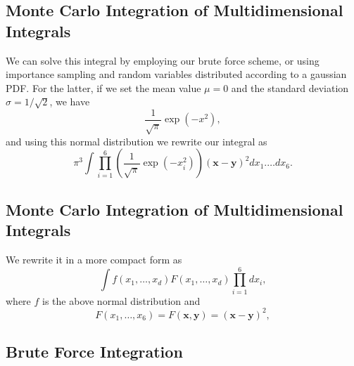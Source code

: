 \documentclass[%
oneside,                 %
final,                   %
10pt]{article}
\newenvironment{block_mdfboxadmon}[1][]{
\begin{block_mdfboxmdframed}[frametitle=#1]
}
{
\end{block_mdfboxmdframed}
}
\begin{document}
\subsection{Monte Carlo Integration of Multidimensional Integrals}

\begin{block_mdfboxadmon}[]
We can solve this integral by employing our brute force scheme,
or using importance sampling and random variables distributed 
according to a gaussian PDF. For the latter, if we set
the mean value 
$\mu=0$ and the standard deviation  $\sigma=1/\sqrt{2}$, we have
\begin{equation*}
   \frac{1}{\sqrt{\pi}}\exp{(-x^2)},
\end{equation*}
and using this normal distribution we rewrite our integral as
\begin{equation*}
   \pi^3\int\prod_{i=1}^6\left(
    \frac{1}{\sqrt{\pi}}\exp{(-x_i^2)}\right)
    (\mathbf{x}-\mathbf{y})^2dx_1.\dots dx_6.
\end{equation*}
\end{block_mdfboxadmon} %



\subsection{Monte Carlo Integration of Multidimensional Integrals}

\begin{block_mdfboxadmon}[]

We  rewrite it in a more compact form as
\begin{equation*}
   \int f(x_1,\dots,x_d)F(x_1,\dots,x_d)\prod_{i=1}^6dx_i,
\end{equation*}
where $f$ is the above normal distribution
and
\begin{equation*}
  F(x_1,\dots,x_6)=F(\mathbf{x, y})=(\mathbf{x}-\mathbf{y})^2,
\end{equation*}
\end{block_mdfboxadmon} %



\subsection{Brute Force Integration}
\end{document}
